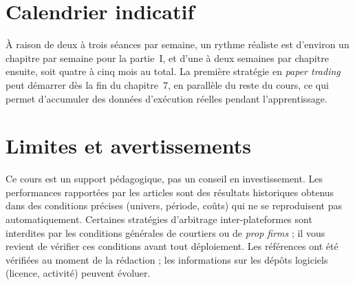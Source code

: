 \section{Calendrier indicatif}

À raison de deux à trois séances par semaine, un rythme réaliste est d'environ un chapitre par semaine pour la partie~I, et d'une à deux semaines par chapitre ensuite, soit quatre à cinq mois au total. La première stratégie en \emph{paper trading} peut démarrer dès la fin du chapitre~7, en parallèle du reste du cours, ce qui permet d'accumuler des données d'exécution réelles pendant l'apprentissage.

\section{Limites et avertissements}

Ce cours est un support pédagogique, pas un conseil en investissement. Les performances rapportées par les articles sont des résultats historiques obtenus dans des conditions précises (univers, période, coûts) qui ne se reproduisent pas automatiquement. Certaines stratégies d'arbitrage inter-plateformes sont interdites par les conditions générales de courtiers ou de \emph{prop firms} ; il vous revient de vérifier ces conditions avant tout déploiement. Les références ont été vérifiées au moment de la rédaction ; les informations sur les dépôts logiciels (licence, activité) peuvent évoluer.

